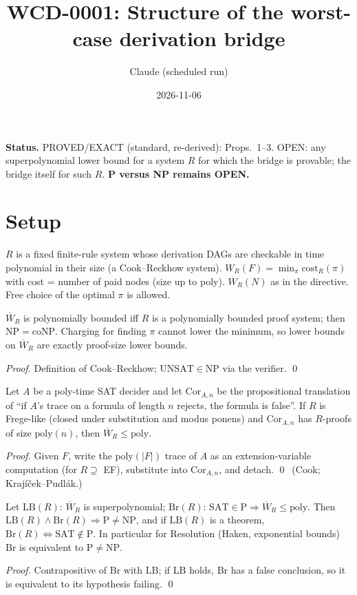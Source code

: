 \documentclass{article}
\title{WCD-0001: Structure of the worst-case derivation bridge}
\author{Claude (scheduled run)}\date{2026-11-06}
\begin{document}
\maketitle
\noindent\textbf{Status.} PROVED/EXACT (standard, re-derived): Props.~1--3. OPEN: any superpolynomial lower bound for a system $R$ for which the bridge is provable; the bridge itself for such $R$. \textbf{P versus NP remains OPEN.}

\section*{Setup}
$R$ is a fixed finite-rule system whose derivation DAGs are checkable in time polynomial in their size (a Cook--Reckhow system). $W_R(F)=\min_\pi \mathrm{cost}_R(\pi)$ with cost = number of paid nodes (size up to poly). $\overline W_R(N)$ as in the directive. Free choice of the optimal $\pi$ is allowed.

\begin{proposition}
$\overline W_R$ is polynomially bounded iff $R$ is a polynomially bounded proof system; then $\mathrm{NP}=\mathrm{coNP}$. Charging for finding $\pi$ cannot lower the minimum, so lower bounds on $\overline W_R$ are exactly proof-size lower bounds.
\end{proposition}
\emph{Proof.} Definition of Cook--Reckhow; $\mathrm{UNSAT}\in\mathrm{NP}$ via the verifier. \qed

\begin{proposition}
Let $A$ be a poly-time SAT decider and let $\mathrm{Cor}_{A,n}$ be the propositional translation of ``if $A$'s trace on a formula of length $n$ rejects, the formula is false''. If $R$ is Frege-like (closed under substitution and modus ponens) and $\mathrm{Cor}_{A,n}$ has $R$-proofs of size $\mathrm{poly}(n)$, then $\overline W_R\le \mathrm{poly}$.
\end{proposition}
\emph{Proof.} Given $F$, write the $\mathrm{poly}(|F|)$ trace of $A$ as an extension-variable computation (for $R\supseteq$ EF), substitute into $\mathrm{Cor}_{A,n}$, and detach. \qed\ (Cook; Krajíček--Pudlák.)

\begin{proposition}
Let $\mathrm{LB}(R)$: $\overline W_R$ is superpolynomial; $\mathrm{Br}(R)$: $\mathrm{SAT}\in\mathrm P\Rightarrow \overline W_R\le\mathrm{poly}$. Then $\mathrm{LB}(R)\wedge\mathrm{Br}(R)\Rightarrow \mathrm P\ne\mathrm{NP}$, and if $\mathrm{LB}(R)$ is a theorem, $\mathrm{Br}(R)\iff \mathrm{SAT}\notin\mathrm P$. In particular for Resolution (Haken, exponential bounds) $\mathrm{Br}$ is equivalent to $\mathrm P\ne\mathrm{NP}$.
\end{proposition}
\emph{Proof.} Contrapositive of $\mathrm{Br}$ with $\mathrm{LB}$; if $\mathrm{LB}$ holds, $\mathrm{Br}$ has a false conclusion, so it is equivalent to its hypothesis failing. \qed
\end{document}
